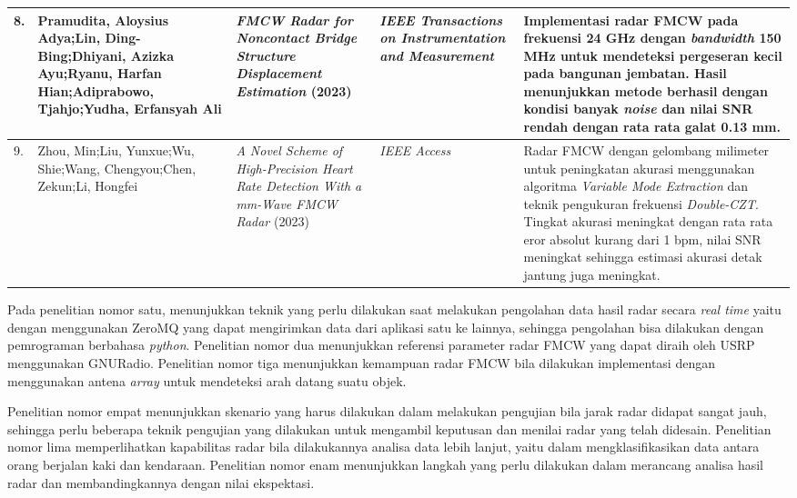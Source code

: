 \begin{center}
\begin{longtable}{|p{0.5cm}|p{2cm}|p{3cm}|p{2.5cm}|p{4cm}|}
	8. & Pramudita, Aloysius Adya;\newline Lin, Ding-Bing;\newline Dhiyani, Azizka Ayu;\newline Ryanu, Harfan Hian;\newline Adiprabowo, Tjahjo;\newline Yudha, Erfansyah Ali
	& \textit{FMCW Radar for Noncontact Bridge Structure Displacement Estimation} (2023)
	& \textit{IEEE Transactions on Instrumentation and Measurement}
	& Implementasi radar FMCW pada frekuensi 24 GHz dengan \textit{bandwidth} 150 MHz untuk mendeteksi pergeseran kecil pada bangunan jembatan. Hasil menunjukkan metode berhasil dengan kondisi banyak \textit{noise} dan nilai SNR rendah dengan rata rata galat 0.13 mm.
	\\ \hline
	
	9. & Zhou, Min;\newline Liu, Yunxue;\newline Wu, Shie;\newline Wang, Chengyou;\newline Chen, Zekun;\newline Li, Hongfei
	& \textit{A Novel Scheme of High-Precision Heart Rate Detection With a mm-Wave FMCW Radar} (2023)
	& \textit{IEEE Access}
	& Radar FMCW dengan gelombang milimeter untuk peningkatan akurasi menggunakan algoritma \textit{Variable Mode Extraction} dan teknik pengukuran frekuensi \textit{Double-CZT}. Tingkat akurasi meningkat dengan rata rata eror absolut kurang dari 1 bpm, nilai SNR meningkat sehingga estimasi akurasi detak jantung juga meningkat.
	\\ \hline
	\end{longtable}
\end{center}

Pada penelitian nomor satu, menunjukkan teknik yang perlu dilakukan saat melakukan pengolahan data hasil radar secara \textit{real time} yaitu dengan menggunakan ZeroMQ yang dapat mengirimkan data dari aplikasi satu ke lainnya, sehingga pengolahan bisa dilakukan dengan pemrograman berbahasa \textit{python}. Penelitian nomor dua menunjukkan referensi parameter radar FMCW yang dapat diraih oleh USRP menggunakan GNURadio. Penelitian nomor tiga menunjukkan kemampuan radar FMCW bila dilakukan implementasi dengan menggunakan antena \textit{array} untuk mendeteksi arah datang suatu objek.

Penelitian nomor empat menunjukkan skenario yang harus dilakukan dalam melakukan pengujian bila jarak radar didapat sangat jauh, sehingga perlu beberapa teknik pengujian yang dilakukan untuk mengambil keputusan dan menilai radar yang telah didesain. Penelitian nomor lima memperlihatkan kapabilitas radar bila dilakukannya analisa data lebih lanjut, yaitu dalam mengklasifikasikan data antara orang berjalan kaki dan kendaraan. Penelitian nomor enam menunjukkan langkah yang perlu dilakukan dalam merancang analisa hasil radar dan membandingkannya dengan nilai ekspektasi.

